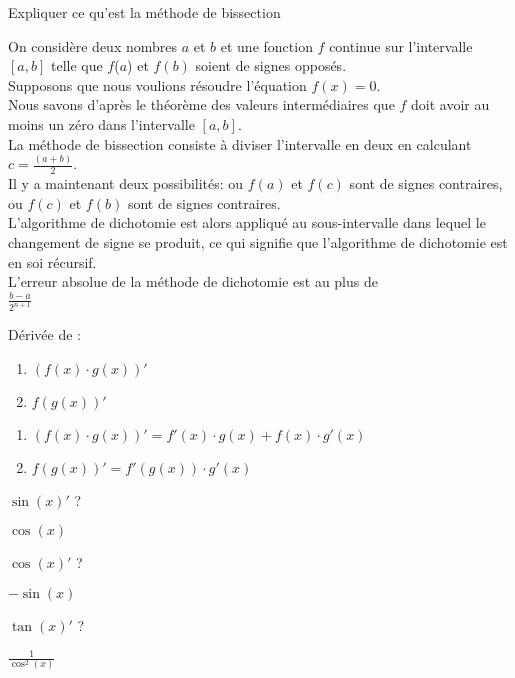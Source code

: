 \documentclass[12pt]{article}
\newcommand*{\xfield}[1]{\begin{mdframed}\centering #1\end{mdframed}\bigskip}
\newenvironment{note}{}{}
\begin{document}
\begin{note}
	\xfield{Expliquer ce qu'est la méthode de bissection}
	\xfield{On considère deux nombres $a$ et $b$ et une fonction $f$ continue sur l'intervalle $[a, b]$ telle que $f$($a$) et $f(b)$ soient de signes opposés.\\
Supposons que nous voulions résoudre l’équation $f(x) = 0$.\\
Nous savons d'après le théorème des valeurs intermédiaires que $f$ doit avoir au moins un zéro dans l’intervalle $[a, b]$.\\
La méthode de bissection consiste à diviser l’intervalle en deux en calculant $c = \frac{(a+b)}{2}$.\\
Il y a maintenant deux possibilités: ou $f(a)$ et $f(c)$ sont de signes contraires, ou $f(c)$ et $f(b)$ sont de signes contraires.\\
L’algorithme de dichotomie est alors appliqué au sous-intervalle dans lequel le changement de signe se produit, ce qui signifie que l’algorithme de dichotomie est en soi récursif.\\
L’erreur absolue de la méthode de dichotomie est au plus de \\
$\frac{b-a}{2^{n+1}}$}
\end{note}

\begin{note}
	\xfield{Dérivée de :
	\begin{enumerate}
		\item $(f(x)\cdot g(x))'$
		\item $f(g(x))'$
\end{enumerate}	}
	\xfield{\begin{enumerate}
		\item $(f(x)\cdot g(x))' =  f'(x)\cdot g(x) + f(x)\cdot g'(x)$
		\item $f(g(x))' = f'(g(x))\cdot g'(x)$
	\end{enumerate} }
\end{note}

\begin{note}
	\xfield{$\sin(x)'$ ?}
	\xfield{$\cos(x)$}
\end{note}

\begin{note}
	\xfield{$\cos(x)'$ ?}
	\xfield{$-\sin(x)$}
\end{note}

\begin{note}
	\xfield{$\tan(x)'$ ?}
	\xfield{$\frac{1}{\cos^2(x)}$}
\end{note}
\end{document}
